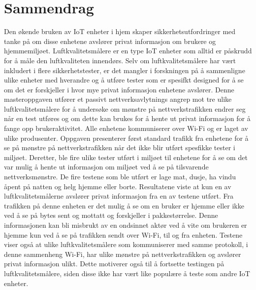 \chapter*{Sammendrag}
Den økende bruken av IoT enheter i hjem skaper sikkerhetsutfordringer med tanke på om disse enhetene avslører privat informasjon om brukere og hjemmemiljøet. Luftkvalitetsmålere er en type IoT
enheter som alltid er påskrudd for å måle den luftkvaliteten innendørs. Selv om luftkvalitetsmålere har vært inkludert i flere sikkerhetstester, er det mangler i forskningen på å sammenligne ulike enheter med hverandre og å utføre tester som er spesifkt designed for å se om det er forskjeller i hvor mye privat informasjon enhetene avslører. Denne masteroppgaven utfører et passivt nettverksavlytnings angrep mot tre ulike luftkvalitetsmålere for å undersøke om mønstre på nettverkstrafikken endrer seg når en test utføres og om dette kan brukes for å hente ut privat informasjon for å fange opp brukeraktivitet. Alle enhetene kommuniserer over Wi-Fi og er laget av ulike produsenter. Oppgaven presenterer først standard trafikk fra enhetene for å se på mønstre på nettverkstrafikken når det ikke blir utført spesfikke tester i miljøet. Deretter, ble fire ulike tester utført i miljøet til enhetene for å se om det var mulig å hente ut informasjon om miljøet ved å se på tilsvarende nettverksmønstre. De fire testene som ble utført er lage mat, dusje, ha vindu åpent på natten og helg hjemme eller borte. Resultatene viste at kun en av luftkvalitetsmålerne avslører privat informasjon fra en av testene utført. Fra trafikken på denne enheten er det mulig å se om en bruker er hjemme eller ikke ved å se på bytes sent og mottatt og forskjeller i pakkestørrelse. Denne informasjonen kan bli misbrukt av en ondsinnet aktør ved å vite om brukeren er hjemme kun ved å se på trafikken sendt over Wi-Fi, til og fra enheten. Testene viser også at ulike luftkvalitetsmålere som kommuniserer med samme protokoll, i denne sammenheng Wi-Fi, har ulike mønstre på nettverkstrafikken og avslører privat informasjon ulikt. Dette motiverer også til å fortsette testingen på luftkvalitetsmålere, siden disse ikke har vært like populære å teste som andre IoT enheter. 